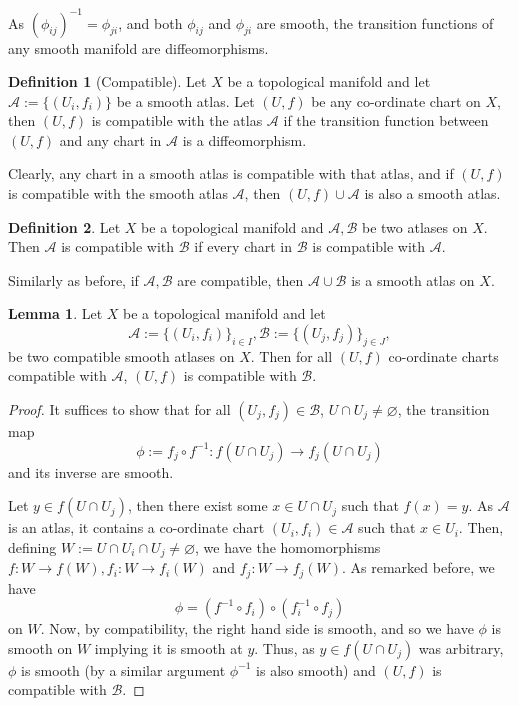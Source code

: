 \documentclass[]{article}
\theoremstyle{definition}
\theoremstyle{definition}
\newtheorem{definition}{Definition}[section]
\newtheorem{lemma}{Lemma}[section]
\begin{document}
As \((\phi_{ij})^{-1} = \phi_{ji}\), and both \(\phi_{ij}\) and \(\phi_{ji}\) 
are smooth, the transition functions of any smooth manifold are diffeomorphisms.

\begin{definition}[Compatible]
  Let \(X\) be a topological manifold and let \(\mathcal{A} := \{(U_i, f_i)\}\) 
  be a smooth atlas. Let \((U, f)\) be any co-ordinate chart on \(X\), then 
  \((U, f)\) is compatible with the atlas \(\mathcal{A}\) if the transition 
  function between \((U, f)\) and any chart in \(\mathcal{A}\) is a 
  diffeomorphism.
\end{definition}

Clearly, any chart in a smooth atlas is compatible with that atlas, and if 
\((U, f)\) is compatible with the smooth atlas \(\mathcal{A}\), then 
\((U, f) \cup \mathcal{A}\) is also a smooth atlas.

\begin{definition}
  Let \(X\) be a topological manifold and \(\mathcal{A}, \mathcal{B}\) be 
  two atlases on \(X\). Then \(\mathcal{A}\) is compatible with \(\mathcal{B}\) 
  if every chart in \(\mathcal{B}\) is compatible with \(\mathcal{A}\).
\end{definition}

Similarly as before, if \(\mathcal{A}, \mathcal{B}\) are compatible, then 
\(\mathcal{A} \cup \mathcal{B}\) is a smooth atlas on \(X\).

\begin{lemma}
  Let \(X\) be a topological manifold and let 
  \[\mathcal{A} := \{(U_i, f_i)\}_{i \in I}, 
    \mathcal{B} := \{(U_j, f_j)\}_{j \in J},\]
  be two compatible smooth atlases on \(X\). Then for all \((U, f)\) co-ordinate 
  charts compatible with \(\mathcal{A}\), \((U, f)\) is compatible with 
  \(\mathcal{B}\).
\end{lemma}
\begin{proof}
  It suffices to show that for all \((U_j, f_j) \in \mathcal{B}\), 
  \(U \cap U_j \neq \varnothing\), the transition map 
  \[\phi := f_j \circ f^{-1} : f(U \cap U_j) \to f_j(U \cap U_j)\]
  and its inverse are smooth. 

  Let \(y \in f(U \cap U_j)\), then there exist some \(x \in U \cap U_j\) such 
  that \(f(x) = y\). As \(\mathcal{A}\) is an atlas, it contains a co-ordinate 
  chart \((U_i, f_i) \in \mathcal{A}\) such that \(x \in U_i\). Then, defining 
  \(W := U \cap U_i \cap U_j \neq \varnothing\), we have the homomorphisms 
  \(f : W \to f(W), f_i : W \to f_i(W)\) and \(f_j : W \to f_j(W)\). As 
  remarked before, we have 
  \[\phi = (f^{-1} \circ f_i) \circ (f_i^{-1} \circ f_j)\]
  on \(W\). Now, by compatibility, the right hand side is smooth, and so 
  we have \(\phi\) is smooth on \(W\) implying it is smooth at \(y\). Thus, 
  as \(y \in f(U \cap U_j)\) was arbitrary, \(\phi\) is smooth (by a similar 
  argument \(\phi^{-1}\) is also smooth) and \((U, f)\) is compatible with 
  \(\mathcal{B}\).
\end{proof}
\end{document}
